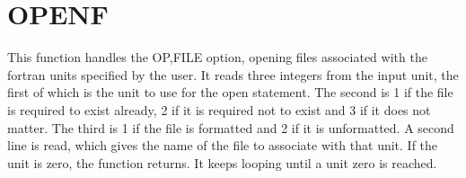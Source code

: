 \section{OPENF}
\label{sect:openf}

\noindent This function handles the OP,FILE option, opening files associated
with the fortran units specified by the user. It reads three integers from
the input unit, the first of which is the unit to use for the open
statement. The second is 1 if the file is required to exist already, 2 if it
is required not to exist and 3 if it does not matter. The third is 1 if the
file is formatted and 2 if it is unformatted. A second line is read, which
gives the name of the file to associate with that unit. If the unit is zero,
the function returns. It keeps looping until a unit zero is reached.\\
